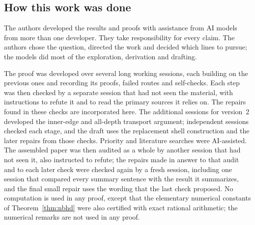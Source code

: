 \subsection*{How this work was done}

The authors developed the results and proofs with assistance from AI models from more than one developer. They take responsibility for every claim. The authors chose the question, directed the work and decided which lines to pursue; the models did most of the exploration, derivation and drafting.

The proof was developed over several long working sessions, each building on the previous ones and recording its proofs, failed routes and self-checks. Each step was then checked by a separate session that had not seen the material, with instructions to refute it and to read the primary sources it relies on. The repairs found in these checks are incorporated here. The additional sessions for version~2 developed the inner-edge and all-depth transport argument; independent sessions checked each stage, and the draft uses the replacement shell construction and the later repairs from those checks. Priority and literature searches were AI-assisted. The assembled paper was then audited as a whole by another session that had not seen it, also instructed to refute; the repairs made in answer to that audit and to each later check were checked again by a fresh session, including one session that compared every summary sentence with the result it summarizes, and the final small repair uses the wording that the last check proposed. No computation is used in any proof, except that the elementary numerical constants of Theorem~\ref{thm:nbhd} were also certified with exact rational arithmetic; the numerical remarks are not used in any proof.
